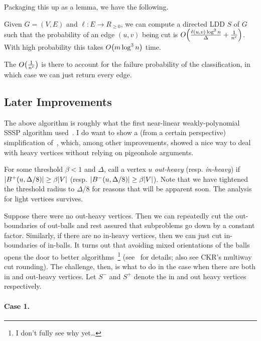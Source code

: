\documentclass[12pt]{article}
\begin{document}
Packaging this up as a lemma, we have the following.
\begin{lemma}
  Given $G = (V, E)$ and $\ell : E \to R_{\geq 0}$, we can compute a directed
  LDD $S$ of $G$ such that the probability of an edge $(u, v)$ being cut is
  $\bigO{ \frac{\ell(u, v)\log^2n}{\Delta} + \frac{1}{ n^c } }$. With high
  probability this takes $\bigO{m\log^3 n}$ time.
\end{lemma}
The $\bigO{\frac{1}{n^c}}$ is there to account for the failure probability of
the classification, in which case we can just return every edge.

\subsection{Later Improvements}

The above algorithm is roughly what the first near-linear weakly-polynomial SSSP
algorithm used~\cite{BNW25}. I do want to show a (from a certain perspective)
simplification of~\cite{Li25}, which, among other improvements, showed a nice
way to deal with heavy vertices without relying on pigeonhole arguments.

For some threshold $\beta < 1$ and $\Delta$, call a vertex $u$ \emph{out-heavy}
(resp. \emph{in-heavy}) if
$\sizeof{ \outball{u, \Delta/8} } \geq \beta \sizeof{V}$ (resp.
$\sizeof{\inball{u, \Delta/8}} \geq \beta \sizeof{V}$). Note that we have
tightened the threshold radius to $\Delta/8$ for reasons that will be apparent
soon. The analysis for light vertices survives.

Suppose there were no out-heavy vertices. Then we can repeatedly cut the
out-boundaries of out-balls and rest assured that subproblems go down by a
constant factor. Similarly, if there are no in-heavy vertices, then we can just
cut in-boundaries of in-balls. It turns out that avoiding mixed orientations of
the balls opens the door to better algorithms~\footnote{I don't fully see why
yet\dots} (see~\cite{Li25} for details; also see CKR's multiway cut rounding).
The challenge, then, is what to do in the case when there are both in and
out-heavy vertices. Let $S^-$ and $S^+$ denote the in and out heavy vertices
respectively.

\paragraph{Case 1.}
\end{document}
